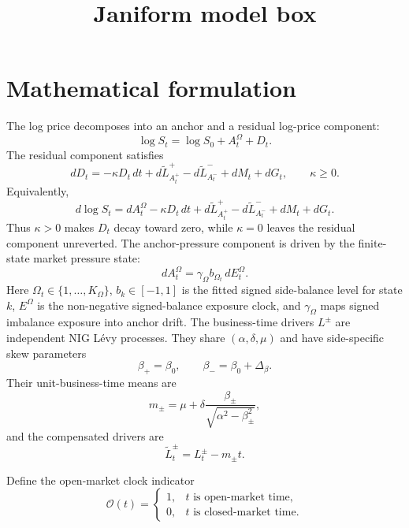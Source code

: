 \documentclass[11pt]{article}
\title{Janiform model box}
\author{}
\date{}
\begin{document}
    \maketitle

    \section*{Mathematical formulation}

    The log price decomposes into an anchor and a residual log-price component:
    \[
        \log S_t=\log S_0+A_t^\Omega+D_t.
    \]
    The residual component satisfies
    \[
        dD_t
        =
        -\kappa D_t\,dt
        +d\widetilde L^+_{A_t^+}
        -d\widetilde L^-_{A_t^-}
        +dM_t
        +dG_t,
        \qquad
        \kappa\ge0.
    \]
    Equivalently,
    \[
        d\log S_t
        =
        dA_t^\Omega
        -\kappa D_t\,dt
        +d\widetilde L^+_{A_t^+}
        -d\widetilde L^-_{A_t^-}
        +dM_t
        +dG_t.
    \]
    Thus \(\kappa>0\) makes \(D_t\) decay toward zero, while
    \(\kappa=0\) leaves the residual component unreverted.
    The anchor-pressure component is driven by the finite-state market pressure
    state:
    \[
        dA_t^\Omega
        =
        \gamma_\Omega b_{\Omega_t}\,dE_t^\Omega.
    \]
    Here \(\Omega_t\in\{1,\ldots,K_\Omega\}\), \(b_k\in[-1,1]\) is the fitted
    signed side-balance level for state \(k\), \(E^\Omega\) is the non-negative
    signed-balance exposure clock, and \(\gamma_\Omega\) maps signed imbalance
    exposure into anchor drift.
    The business-time drivers \(L^\pm\) are independent NIG Lévy processes.
    They share \((\alpha,\delta,\mu)\) and have side-specific skew parameters
    \[
        \beta_+=\beta_0,
        \qquad
        \beta_-=\beta_0+\Delta_\beta.
    \]
    Their unit-business-time means are
    \[
        m_\pm
        =
        \mu+\delta\frac{\beta_\pm}{\sqrt{\alpha^2-\beta_\pm^2}},
    \]
    and the compensated drivers are
    \[
        \widetilde L_t^\pm
        =
        L_t^\pm-m_\pm t.
    \]

    Define the open-market clock indicator
    \[
        \mathcal O(t)
        =
        \begin{cases}
            1, & t \text{ is open-market time},\\
            0, & t \text{ is closed-market time}.
        \end{cases}
    \]
\end{document}
